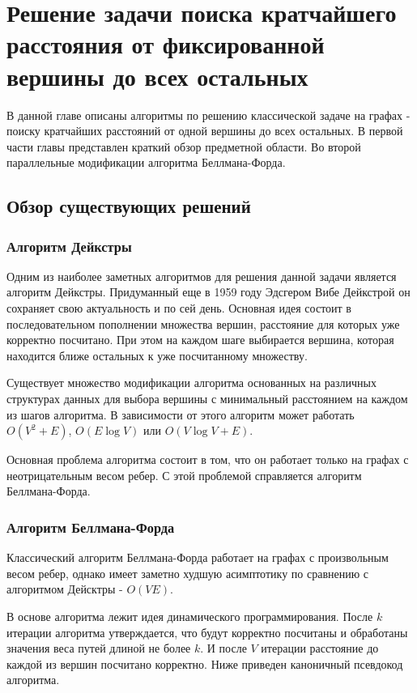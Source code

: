 \chapter{Решение задачи поиска кратчайшего расстояния от фиксированной вершины до всех остальных}
\label{chapSVD}

В данной главе описаны алгоритмы по решению классической задаче на графах - поиску кратчайших расстояний от одной вершины до всех остальных. В первой части главы представлен краткий обзор предметной области. Во второй параллельные модификации алгоритма Беллмана-Форда. 

\FloatBarrier
\section{Обзор существующих решений}
\subsection{Алгоритм Дейкстры}

Одним из наиболее заметных алгоритмов для решения данной задачи является алгоритм Дейкстры. Придуманный еще в 1959 году Эдсгером Вибе Дейкстрой он сохраняет свою актуальность и по сей день. Основная идея состоит в последовательном пополнении множества вершин, расстояние для которых уже корректно посчитано. При этом на каждом шаге выбирается вершина, которая находится ближе остальных к уже посчитанному множеству. 

Существует множество модификации алгоритма основанных на различных структурах данных для выбора вершины с минимальный расстоянием на каждом из шагов алгоритма. В зависимости от этого алгоритм может работать $O(V^2+E)$, $O(E \log V)$ или $O(V \log V+E)$. 

Основная проблема алгоритма состоит в том, что он работает только на графах с неотрицательным весом ребер. С этой проблемой справляется алгоритм Беллмана-Форда. 


\FloatBarrier
\subsection{Алгоритм Беллмана-Форда}

Классический алгоритм Беллмана-Форда работает на графах с произвольным весом ребер, однако имеет заметно худшую асимптотику по сравнению с алгоритмом Дейсктры - $O(VE)$. 

В основе алгоритма лежит идея динамического программирования. После $k$ итерации алгоритма утверждается, что будут корректно посчитаны и обработаны значения веса путей длиной не более $k$. И после $V$ итерации расстояние до каждой из вершин посчитано корректно. Ниже приведен каноничный псевдокод алгоритма. 

